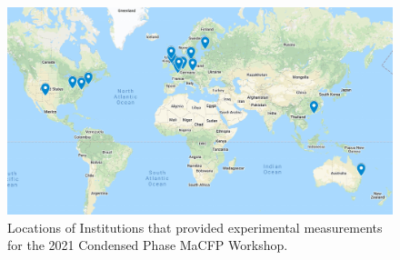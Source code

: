 \documentclass{book}
\begin{document}
\begin{figure}[h]
  \centering
  \includegraphics[width=6in]{FIGURES/MaCFP_Map}
  \caption{Locations of Institutions that provided experimental measurements for the 2021 Condensed Phase MaCFP Workshop.}
  \label{Fig:MaCFP_Map_20200831}
\end{figure}
\end{document}
